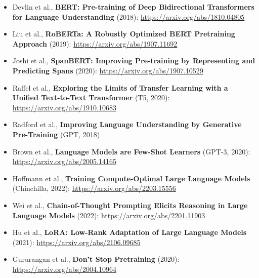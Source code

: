 \begin{itemize}
    \item Devlin et al., \textbf{BERT: Pre-training of Deep Bidirectional Transformers for Language Understanding} (2018): \url{https://arxiv.org/abs/1810.04805}
    \item Liu et al., \textbf{RoBERTa: A Robustly Optimized BERT Pretraining Approach} (2019): \url{https://arxiv.org/abs/1907.11692}
    \item Joshi et al., \textbf{SpanBERT: Improving Pre-training by Representing and Predicting Spans} (2020): \url{https://arxiv.org/abs/1907.10529}
    \item Raffel et al., \textbf{Exploring the Limits of Transfer Learning with a Unified Text-to-Text Transformer} (T5, 2020): \url{https://arxiv.org/abs/1910.10683}
    \item Radford et al., \textbf{Improving Language Understanding by Generative Pre-Training} (GPT, 2018)
    \item Brown et al., \textbf{Language Models are Few-Shot Learners} (GPT-3, 2020): \url{https://arxiv.org/abs/2005.14165}
    \item Hoffmann et al., \textbf{Training Compute-Optimal Large Language Models} (Chinchilla, 2022): \url{https://arxiv.org/abs/2203.15556}
    \item Wei et al., \textbf{Chain-of-Thought Prompting Elicits Reasoning in Large Language Models} (2022): \url{https://arxiv.org/abs/2201.11903}
    \item Hu et al., \textbf{LoRA: Low-Rank Adaptation of Large Language Models} (2021): \url{https://arxiv.org/abs/2106.09685}
    \item Gururangan et al., \textbf{Don't Stop Pretraining} (2020): \url{https://arxiv.org/abs/2004.10964}
\end{itemize}


